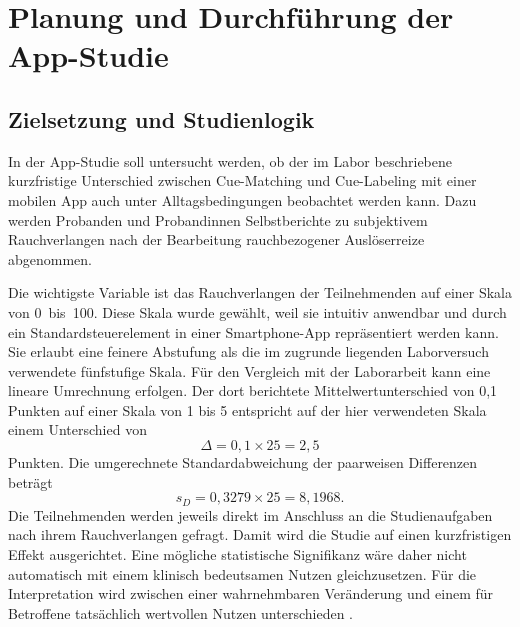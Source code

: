 

\chapter{Planung und Durchführung der App-Studie}

\section{Zielsetzung und Studienlogik}
In der App-Studie soll untersucht werden, ob der im Labor beschriebene kurzfristige Unterschied zwischen Cue-Matching und Cue-Labeling mit einer mobilen App auch unter Alltagsbedingungen beobachtet werden kann. Dazu werden Probanden und Probandinnen Selbstberichte zu subjektivem Rauchverlangen nach der Bearbeitung rauchbezogener Auslöserreize abgenommen.

Die wichtigste Variable ist das Rauchverlangen der Teilnehmenden auf einer Skala von 0~bis~100. Diese Skala wurde gewählt, weil sie intuitiv anwendbar und durch ein Standardsteuerelement in einer Smartphone-App repräsentiert werden kann. Sie erlaubt eine feinere Abstufung als die im zugrunde liegenden Laborversuch verwendete fünfstufige Skala. Für den Vergleich mit der Laborarbeit kann eine lineare Umrechnung erfolgen. Der dort berichtete Mittelwertunterschied von 0,1 Punkten auf einer Skala von 1 bis 5 entspricht auf der hier verwendeten Skala einem Unterschied von
\begin{equation}
    \Delta = 0{,}1 \times 25 = 2{,}5
\end{equation}
Punkten. Die umgerechnete Standardabweichung der paarweisen Differenzen beträgt
\begin{equation}
    s_D = 0{,}3279 \times 25 = 8{,}1968.
\end{equation}
Die Teilnehmenden werden jeweils direkt im Anschluss an die Studienaufgaben nach ihrem Rauchverlangen gefragt. Damit wird die Studie auf einen kurzfristigen Effekt ausgerichtet. Eine mögliche statistische Signifikanz wäre daher nicht automatisch mit einem klinisch bedeutsamen Nutzen gleichzusetzen. Für die Interpretation wird zwischen einer wahrnehmbaren Veränderung und einem für Betroffene tatsächlich wertvollen Nutzen unterschieden \cite{tabibnia_cuelabeling_2026,weinfurt_clinically_meaningful_2019}.

